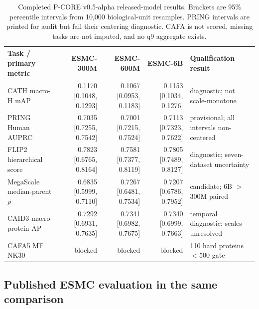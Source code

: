 \documentclass{article}
\begin{document}
\begin{table}[H]
  \centering
  \scriptsize
  \setlength{\tabcolsep}{3pt}
  \begin{tabularx}{\textwidth}{@{}lrrrY@{}}
    \toprule
    Task / primary metric & ESMC-300M & ESMC-600M & ESMC-6B & Qualification result \\
    \midrule
    CATH macro-H mAP & 0.1170 [0.1048, 0.1293] & 0.1067 [0.0953, 0.1183] & 0.1153 [0.1034, 0.1276] & diagnostic; not scale-monotone \\
    PRING Human AUPRC & 0.7035 [0.7255, 0.7542] & 0.7001 [0.7215, 0.7524] & 0.7113 [0.7323, 0.7622] & provisional; all intervals non-centered \\
    FLIP2 hierarchical score & 0.7823 [0.6765, 0.8164] & 0.7581 [0.7377, 0.8119] & 0.7805 [0.7489, 0.8127] & diagnostic; seven-dataset uncertainty \\
    MegaScale median-parent $\rho$ & 0.6835 [0.5999, 0.7110] & 0.7267 [0.6481, 0.7534] & 0.7207 [0.6786, 0.7952] & candidate; 6B $>$ 300M paired \\
    CAID3 macro-protein AP & 0.7292 [0.6931, 0.7635] & 0.7341 [0.6982, 0.7675] & 0.7340 [0.6999, 0.7663] & temporal diagnostic; scales unresolved \\
    CAFA5 MF NK30 & blocked & blocked & blocked & 110 hard proteins $<500$ gate \\
    \bottomrule
  \end{tabularx}
  \caption{Completed P-CORE v0.5-alpha released-model results. Brackets are
  95\% percentile intervals from 10,000 biological-unit resamples. PRING
  intervals are printed for audit but fail their centering diagnostic. CAFA is
  not scored, missing tasks are not imputed, and no q9 aggregate exists.}
  \label{tab:pcore-v05-results}
\end{table}

\subsection{Published ESMC evaluation in the same comparison}
\end{document}
